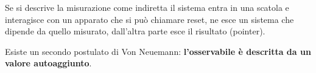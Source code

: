 Se si descrive la misurazione come indiretta il sistema entra in una scatola e interagisce con un apparato che si può chiamare reset, ne esce un sistema che dipende da quello misurato, dall'altra parte esce il risultato (pointer).

Esiste un secondo postulato di Von Neuemann: \textbf{l'osservabile è descritta da un valore autoaggiunto}.